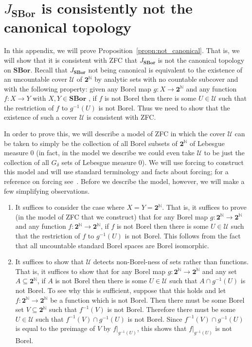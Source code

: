 \documentclass[11pt]{amsart}
\newcommand\alttext{\texorpdfstring}
\newcommand\cU{\mathcal{U}}
\newcommand\I{^{-1}}
\newcommand{\N}{\mathbb{N}}
\newcommand\rstr[2]{{\left.#1\right|_{#2}}}
\newcommand\SBor{\mathbf{SBor}}
\newcommand\two{\mathbf{2}}
\newcommand\Cantor{\two^\N}
\theoremstyle{definition}
\theoremstyle{remark}
\theoremstyle{plain}
\begin{document}
\appendix

\section{\alttext{\( J_{\SBor} \)}{J\_SBor} is consistently not the canonical topology}\label{sec:necessity-of-ch}

In this appendix, we will prove Proposition~\ref{propn:not_canonical}. That is, we will show that it is consistent with ZFC that $J_\SBor$ is not the canonical topology on $\SBor$. Recall that $J_\SBor$ not being canonical is equivalent to the existence of an uncountable cover $\cU$ of $\Cantor$ by analytic sets with no countable subcover and with the following property: given any Borel map $g\colon X \to \Cantor$ and any function $f\colon X \to Y$ with $X, Y \in \SBor$ , if $f$ is not Borel then there is some $U \in \cU$ such that the restriction of $f$ to $g\I(U)$ is not Borel. Thus we need to show that the existence of such a cover $\cU$ is consistent with ZFC.

In order to prove this, we will describe a model of ZFC in which the cover $\cU$ can be taken to simply be the collection of all Borel subsets of $\Cantor$ of Lebesgue measure $0$ (in fact, in the model we describe we could even take $\cU$ to be just the collection of all $G_\delta$ sets of Lebesgue measure $0$). We will use forcing to construct this model and will use standard terminology and facts about forcing; for a reference on forcing see~\cite{kunen-set-theory-1980}. Before we describe the model, however, we will make a few simplifying observations.

\begin{enumerate}
\item It suffices to consider the case where $X = Y = \Cantor$. That is, it suffices to prove (in the model of ZFC that we construct) that for any Borel map $g\colon \Cantor \to \Cantor$ and any function $f\colon \Cantor \to \Cantor$, if $f$ is not Borel then there is some $U \in \cU$ such that the restriction of $f$ to $g\I(U)$ is not Borel. This follows from the fact that all uncountable standard Borel spaces are Borel isomorphic.

\item It suffices to show that $\cU$ detects non-Borel-ness of sets rather than functions. That is, it suffices to show that for any Borel map $g\colon \Cantor \to \Cantor$ and any set $A \subseteq \Cantor$, if $A$ is not Borel then there is some $U \in \cU$ such that $A\cap g\I(U)$ is not Borel. To see why this is sufficient, suppose that this holds and let $f\colon \Cantor \to \Cantor$ be a function which is not Borel. Then there must be some Borel set $V \subseteq \Cantor$ such that $f\I(V)$ is not Borel. Therefore there must be some $U \in \cU$ such that $f\I(V)\cap g\I(U)$ is not Borel. Since $f\I(V)\cap g\I(U)$ is equal to the preimage of $V$ by $\rstr{f}{g\I(U)}$, this shows that $\rstr{f}{g\I(U)}$ is not Borel.
\end{enumerate}
\end{document}
